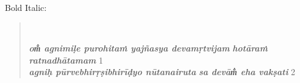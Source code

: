 \documentclass[12pt,oneside,a4paper]{xraum}
\begin{document}
Bold Italic:

\begin{quote}
\textit{\bfseries{}}\\
\textit{\bfseries{}}

\textit{\bfseries om̐ agnimiḷe purohitaṁ yajñasya devamṛtvijam} 
\textit{\bfseries hotāraṁ ratnadhātamam}  1\\
\textit{\bfseries agniḥ pūrvebhirṛṣibhirīḍyo nūtanairuta} 
\textit{\bfseries sa devām̐ eha vakṣati}  2
\end{quote}
\end{document}

